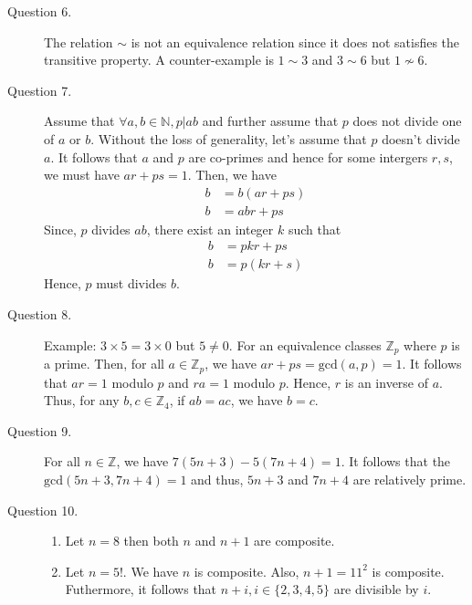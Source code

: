 \documentclass[]{article}
\begin{document}
\begin{description}
    \item[Question 6.] The relation $\sim$ is not an equivalence relation since it does not satisfies the transitive property. A counter-example is $1 \sim 3$ and $3 \sim 6$ but $1 \not\sim 6$.
    \item[Question 7.] Assume that $\forall a,b \in \mathbb{N}, p|ab  $ and further assume that $p$ does not divide one of $a$ or $b$. Without the loss of generality, let's assume that $p$ doesn't divide $a$. It follows that $a$ and $p$ are co-primes and hence for some intergers $r,s$, we must have $ar+ps = 1$. Then, we have \begin{align*}
        b &= b(ar+ps)\\
        b &= abr + ps
    \end{align*} Since, $p$ divides $ab$, there exist an integer $k$ such that \begin{align*}
        b &= pkr + ps\\
        b &= p(kr +s)
    \end{align*} Hence, $p$ must divides $b$.
    \item[Question 8.] Example: $3\times 5 = 3\times 0$ but $5 \neq 0$. For an equivalence classes $\mathbb{Z}_p$ where $p$ is a prime. Then, for all $a \in \mathbb{Z}_p$, we have $ar+ps = \text{gcd}(a,p) = 1$. It follows that $ar = 1$ modulo $p$ and $ra = 1$ modulo $p$. Hence, $r$ is an inverse of $a$. Thus, for any $b,c \in \mathbb{Z}_4$, if $ab = ac$, we have $b=c$.
    \item[Question 9.] For all $n \in \mathbb{Z}$, we have $7(5n+3) - 5(7n + 4) = 1$. It follows that the $\text{gcd}(5n+3,7n+4) = 1$ and thus, $5n+3$ and $7n+4$ are relatively prime.
    \item[Question 10.] \begin{enumerate}
        \item Let $n = 8$ then both $n$ and $n+1$ are composite. 
        \item Let $n=5!$. We have $n$ is composite. Also, $n+1 = 11^2$ is composite. Futhermore, it follows that $n+i, i \in \{2,3,4,5\}$ are divisible by $i$.
    \end{enumerate} 
\end{description}
\end{document}

